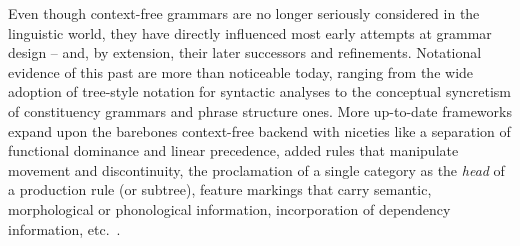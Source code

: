 Even though context-free grammars are no longer seriously considered in the linguistic world, they have directly influenced most early attempts at grammar design -- and, by extension, their later successors and refinements.
Notational evidence of this past are more than noticeable today, ranging from the wide adoption of tree-style notation for syntactic analyses to the conceptual syncretism of constituency grammars and phrase structure ones.
More up-to-date frameworks expand upon the barebones context-free backend with niceties like a separation of functional dominance and linear precedence, added rules that manipulate movement and discontinuity, the proclamation of a single category as the \textit{head} of a production rule (or subtree), feature markings that carry semantic, morphological or phonological information, incorporation of dependency information, etc.~\cite[inter alia]{gazdar1985generalized,jacobson1987phrase,pollard1994head,dalrymple2001lexical}.

